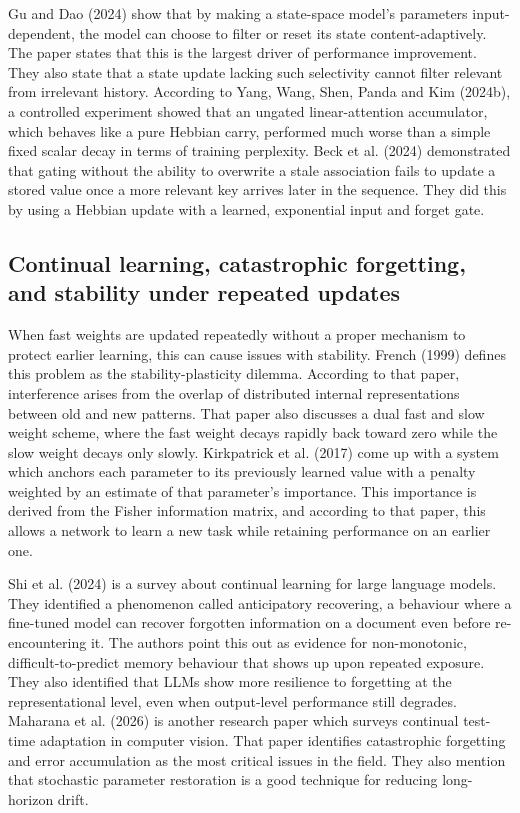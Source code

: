 \documentclass[12pt,a4paper]{article}
\begin{document}
Gu and Dao (2024) show that by making a state-space model's parameters input-dependent, the model can choose to filter or reset its state content-adaptively. The paper states that this is the largest driver of performance improvement. They also state that a state update lacking such selectivity cannot filter relevant from irrelevant history. According to Yang, Wang, Shen, Panda and Kim (2024b), a controlled experiment showed that an ungated linear-attention accumulator, which behaves like a pure Hebbian carry, performed much worse than a simple fixed scalar decay in terms of training perplexity. Beck et al. (2024) demonstrated that gating without the ability to overwrite a stale association fails to update a stored value once a more relevant key arrives later in the sequence. They did this by using a Hebbian update with a learned, exponential input and forget gate.

\subsection*{Continual learning, catastrophic forgetting, and stability under repeated updates}

When fast weights are updated repeatedly without a proper mechanism to protect earlier learning, this can cause issues with stability. French (1999) defines this problem as the stability-plasticity dilemma. According to that paper, interference arises from the overlap of distributed internal representations between old and new patterns. That paper also discusses a dual fast and slow weight scheme, where the fast weight decays rapidly back toward zero while the slow weight decays only slowly. Kirkpatrick et al. (2017) come up with a system which anchors each parameter to its previously learned value with a penalty weighted by an estimate of that parameter's importance. This importance is derived from the Fisher information matrix, and according to that paper, this allows a network to learn a new task while retaining performance on an earlier one.

Shi et al. (2024) is a survey about continual learning for large language models. They identified a phenomenon called anticipatory recovering, a behaviour where a fine-tuned model can recover forgotten information on a document even before re-encountering it. The authors point this out as evidence for non-monotonic, difficult-to-predict memory behaviour that shows up upon repeated exposure. They also identified that LLMs show more resilience to forgetting at the representational level, even when output-level performance still degrades. Maharana et al. (2026) is another research paper which surveys continual test-time adaptation in computer vision. That paper identifies catastrophic forgetting and error accumulation as the most critical issues in the field. They also mention that stochastic parameter restoration is a good technique for reducing long-horizon drift.
\end{document}

